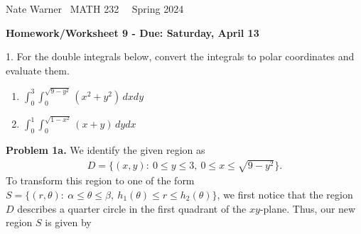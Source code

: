 \documentclass{report}
\title{\Huge{}}
\author{\huge{Nathan Warner}}
\date{\huge{}}
\begin{document}
    \pagebreak \bigbreak \noindent
    Nate Warner \ \quad \quad \quad \quad \quad \quad \quad \quad \quad \quad \quad \quad  MATH 232 \quad  \quad \quad \quad \quad \quad \quad \quad \quad \ \ \quad \quad Spring 2024
    \begin{center}
        \textbf{Homework/Worksheet 9 - Due: Saturday, April 13}
    \end{center}
    \bigbreak \noindent 
    \begin{mdframed}
        1. For the double integrals below, convert the integrals to polar coordinates and evaluate them.
        \begin{enumerate}[label=(\alph*)]
            \item $\int_{0}^{3}\int_{0}^{\sqrt{9-y^{2}}}  (x^{2} + y^{2})\,  dxdy$
            \item $\int_{0}^{1}\int_{0}^{\sqrt{1-x^{2}}}  (x+y)\,  dydx$
        \end{enumerate}
    \end{mdframed}
    \bigbreak \noindent 
    \textbf{Problem 1a.} We identify the given region as
    \begin{align*}
        D = \{(x,y):\ 0 \leq y \leq 3,\ 0 \leq x \leq \sqrt{9-y^2}\}
    .\end{align*}
    To transform this region to one of the form $S = \{(r,\theta ):\ \alpha \leq \theta \leq \beta,\ h_{1}(\theta ) \leq r \leq h_{2}(\theta) \}$, we first notice that the region $D$ describes a quarter circle in the first quadrant of the $xy$-plane. Thus, our new region $S$ is given by
\end{document}
